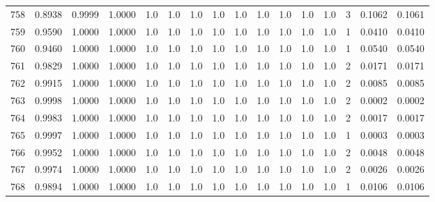 \begin{tabular}{lrrrrrrrrrrrrrrr}
758 &      0.8938 &  0.9999 &  1.0000 &     1.0 &     1.0 &     1.0 &     1.0 &     1.0 &     1.0 &     1.0 &      1.0 &        1.0 &      3 &                    0.1062 &                     0.1061 \\
759 &      0.9590 &  1.0000 &  1.0000 &     1.0 &     1.0 &     1.0 &     1.0 &     1.0 &     1.0 &     1.0 &      1.0 &        1.0 &      1 &                    0.0410 &                     0.0410 \\
760 &      0.9460 &  1.0000 &  1.0000 &     1.0 &     1.0 &     1.0 &     1.0 &     1.0 &     1.0 &     1.0 &      1.0 &        1.0 &      1 &                    0.0540 &                     0.0540 \\
761 &      0.9829 &  1.0000 &  1.0000 &     1.0 &     1.0 &     1.0 &     1.0 &     1.0 &     1.0 &     1.0 &      1.0 &        1.0 &      2 &                    0.0171 &                     0.0171 \\
762 &      0.9915 &  1.0000 &  1.0000 &     1.0 &     1.0 &     1.0 &     1.0 &     1.0 &     1.0 &     1.0 &      1.0 &        1.0 &      2 &                    0.0085 &                     0.0085 \\
763 &      0.9998 &  1.0000 &  1.0000 &     1.0 &     1.0 &     1.0 &     1.0 &     1.0 &     1.0 &     1.0 &      1.0 &        1.0 &      2 &                    0.0002 &                     0.0002 \\
764 &      0.9983 &  1.0000 &  1.0000 &     1.0 &     1.0 &     1.0 &     1.0 &     1.0 &     1.0 &     1.0 &      1.0 &        1.0 &      2 &                    0.0017 &                     0.0017 \\
765 &      0.9997 &  1.0000 &  1.0000 &     1.0 &     1.0 &     1.0 &     1.0 &     1.0 &     1.0 &     1.0 &      1.0 &        1.0 &      1 &                    0.0003 &                     0.0003 \\
766 &      0.9952 &  1.0000 &  1.0000 &     1.0 &     1.0 &     1.0 &     1.0 &     1.0 &     1.0 &     1.0 &      1.0 &        1.0 &      2 &                    0.0048 &                     0.0048 \\
767 &      0.9974 &  1.0000 &  1.0000 &     1.0 &     1.0 &     1.0 &     1.0 &     1.0 &     1.0 &     1.0 &      1.0 &        1.0 &      2 &                    0.0026 &                     0.0026 \\
768 &      0.9894 &  1.0000 &  1.0000 &     1.0 &     1.0 &     1.0 &     1.0 &     1.0 &     1.0 &     1.0 &      1.0 &        1.0 &      1 &                    0.0106 &                     0.0106 \\

\end{tabular}
